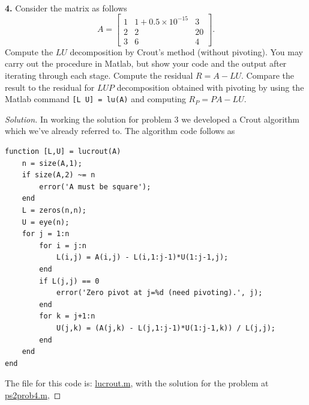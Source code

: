 \documentclass[12pt]{amsart}
\newenvironment{solution}
{\begin{proof}[Solution]}
{\end{proof}}
\begin{document}
\begin{onehalfspace}
        \quad\\
        \noindent\textbf{4.} Consider the matrix as follows
        \begin{displaymath}
            A = \left[\begin{matrix}
                          1 & 1+0.5\times 10^{-15} & 3\\
                          2 & 2 & 20 \\
                          3 & 6 & 4
            \end{matrix}\right].
        \end{displaymath}
        Compute the $LU$ decomposition by Crout's method (without pivoting).
        You may carry out the procedure in Matlab, but show your code and the output after iterating through each stage.
        Compute the residual $R=A-LU$.
        Compare the result to the residual for $LUP$ decomposition obtained with pivoting by using the Matlab command
        \texttt{[L U] = lu(A)} and computing $R_P = PA-LU$.
        \begin{solution}
            In working the solution for problem 3 we developed a Crout algorithm which we've already referred to.
            The algorithm code follows as
            \begin{verbatim}
function [L,U] = lucrout(A)
    n = size(A,1);
    if size(A,2) ~= n
        error('A must be square');
    end
    L = zeros(n,n);
    U = eye(n);
    for j = 1:n
        for i = j:n
            L(i,j) = A(i,j) - L(i,1:j-1)*U(1:j-1,j);
        end
        if L(j,j) == 0
            error('Zero pivot at j=%d (need pivoting).', j);
        end
        for k = j+1:n
            U(j,k) = (A(j,k) - L(j,1:j-1)*U(1:j-1,k)) / L(j,j);
        end
    end
end
            \end{verbatim}
            The file for this code is:
            \href{https://github.com/chtompki/MathSpring2026/tree/main/NumericalAnalysis/ProblemSet2/lucrout.m}{lucrout.m},
            with the solution for the problem at
            \href{https://github.com/chtompki/MathSpring2026/tree/main/NumericalAnalysis/ProblemSet2/ps2prob4.m}{ps2prob4.m},


\end{solution}
\end{onehalfspace}
\end{document}
